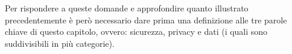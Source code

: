 Per rispondere a queste domande e approfondire quanto illustrato precedentemente è però necessario dare prima una definizione alle tre parole chiave di questo capitolo, ovvero: sicurezza, privacy e dati (i quali sono suddivisibili in più categorie). 